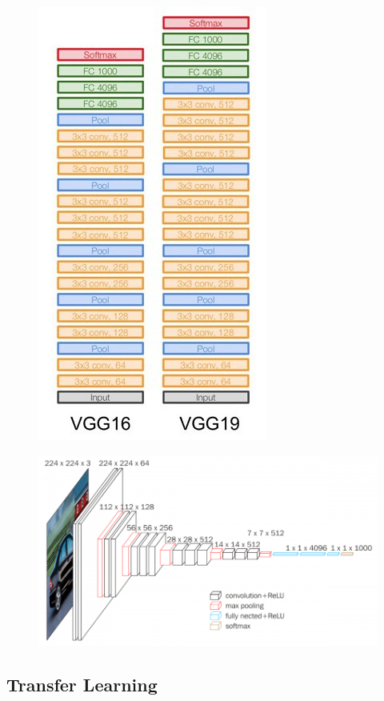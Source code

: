 \documentclass[a4paper,11pt]{article}
\begin{document}
\begin{figure}[H]
	\centering
	\includegraphics[width=0.6\linewidth]{img/vgg1}
	\caption{}
	\label{fig:vgg1}
\end{figure}

\begin{figure}[H]
	\centering
	\includegraphics[width=1\linewidth]{img/vgg2}
	\caption{}
	\label{fig:vgg2}
\end{figure}

\subsection{Transfer Learning}
\end{document}
